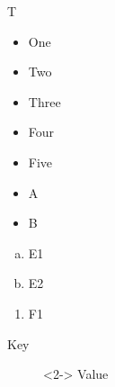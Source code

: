 \documentclass{beamer}
\begin{document}
\begin{frame}{T}
\begin{itemize}
\item One
\item<2-> Two
\item<3-| alert@3> Three
\item[x]<4-> Four
\item<5->[y] Five
\end{itemize}
\begin{itemize}[<+->]
\item A
\item B
\end{itemize}
\begin{enumerate}[(a)]
\item E1
\item E2
\end{enumerate}
\begin{enumerate}[<+->][i.]
\item F1
\end{enumerate}
\begin{description}
\item[Key]<2-> Value
\end{description}
\end{frame}
\end{document}
